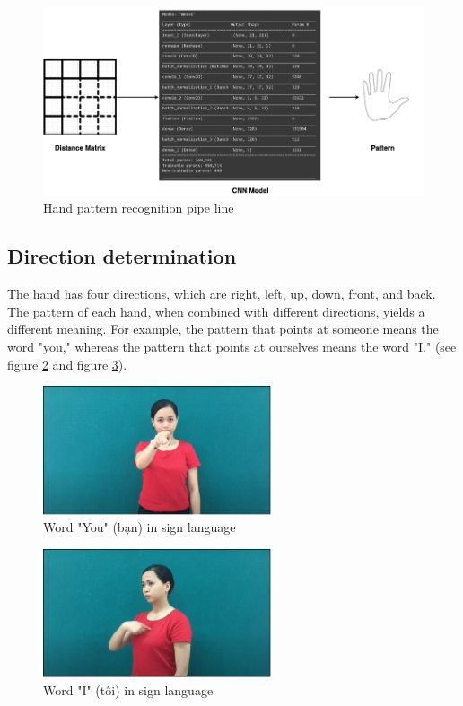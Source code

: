 \begin{figure}[H]
	\centering
	\includegraphics[width=\textwidth]{img/Chap4/Hand-Pattern-Reg-Model.png}
	\caption{Hand pattern recognition pipe line}
	\label{fig:Chap4-StructureOfConvolutionalNeuralNetwork}
\end{figure}

\subsection{Direction determination}

The hand has four directions, which are right, left, up, down, front, and back. The pattern of each hand, when combined with different directions, yields a different meaning. For example, the pattern that points at someone means the word "you," whereas the pattern that points at ourselves means the word "I." (see figure \ref{fig:Chap4-WordYouInSignLanguage} and figure \ref{fig:Chap4-WordIInSignLanguage}).

\begin{figure}[H]
	\centering
	\includegraphics[width=0.6\textwidth]{img/Chap4/WordYouInSignLanguage.png}
	\caption{Word "You" (bạn) in sign language}
	\label{fig:Chap4-WordYouInSignLanguage}
\end{figure}

\begin{figure}[H]
	\centering
	\includegraphics[width=0.6\textwidth]{img/Chap4/WordIInSignLanguage.png}
	\caption{Word "I" (tôi) in sign language}
	\label{fig:Chap4-WordIInSignLanguage}
\end{figure}

